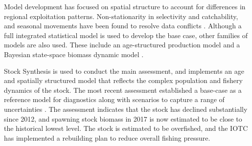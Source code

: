 \documentclass[12pt,halfline,a4paper,nonumbib]{ouparticle}
\begin{document}
Model development has focused on spatial structure to account for differences in regional exploitation patterns. Non-stationarity in selectivity and catchability, and seasonal movements have been found to resolve data conflicts  \parencite{urtizberea2018yft}. Although a full integrated statistical model is used to develop the base case, other families of models are also used.  These include  an age-structured production model \parencite[ASPM,][]{maunder2015contemporary} and a Bayesian state-space biomass dynamic model \parencite[JABBA,][]{winker2018jabba}. 

Stock Synthesis \parencite[SS,][]{methot2013stock} is used to conduct the main assessment, and implements an age and spatially structured model that reflects the complex population and fishery dynamics of the stock. The most recent assessment established a base-case as a reference model for diagnostics along with scenarios to capture a range of uncertainties \parencite{fu2018yft}. The assessment indicates that the stock has declined substantially since 2012, and spawning stock biomass in 2017 is now estimated to be close to the historical lowest level. The stock is estimated to be overfished, and the IOTC has implemented a rebuilding plan to reduce overall fishing pressure.  

\end{document}
